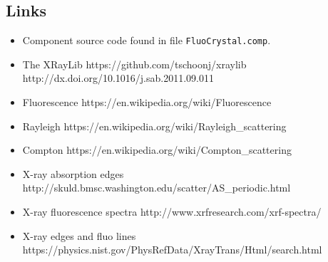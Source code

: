 \subsection*{Links}
\begin{itemize}
  \item Component source code found in file \texttt{FluoCrystal.comp}.
  \item The XRayLib https://github.com/tschoonj/xraylib http://dx.doi.org/10.1016/j.sab.2011.09.011
  \item Fluorescence https://en.wikipedia.org/wiki/Fluorescence
  \item Rayleigh https://en.wikipedia.org/wiki/Rayleigh\_scattering
  \item Compton https://en.wikipedia.org/wiki/Compton\_scattering
  \item X-ray absorption edges http://skuld.bmsc.washington.edu/scatter/AS\_periodic.html
  \item X-ray fluorescence spectra http://www.xrfresearch.com/xrf-spectra/
  \item X-ray edges and fluo lines https://physics.nist.gov/PhysRefData/XrayTrans/Html/search.html
\end{itemize}
